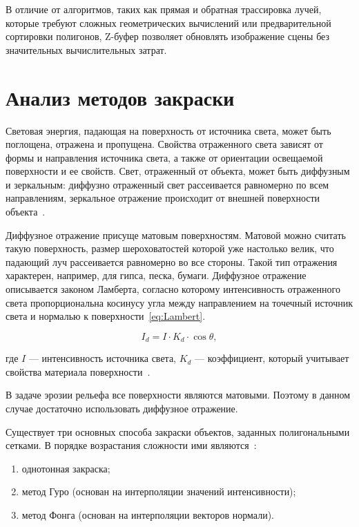 В отличие от алгоритмов, таких как прямая и обратная трассировка лучей,
которые требуют сложных геометрических вычислений или предварительной сортировки полигонов,
Z-буфер позволяет обновлять изображение сцены без значительных вычислительных затрат.

\clearpage

\section{Анализ методов закраски}

Световая энергия, падающая на поверхность от источника света, может быть поглощена,
отражена и пропущена.
Свойства отраженного света зависят от формы и направления источника света, а также от
ориентации освещаемой поверхности и ее свойств.
Свет, отраженный от объекта, может быть
диффузным и зеркальным: диффузно отраженный свет рассеивается равномерно по всем
направлениям, зеркальное отражение происходит от внешней поверхности объекта~\cite{cg_shik}.

Диффузное отражение присуще матовым поверхностям. Матовой можно считать такую поверхность,
размер шероховатостей которой уже настолько велик, что
падающий луч рассеивается равномерно во все стороны. Такой тип отражения характерен, например, для гипса, песка, бумаги.
Диффузное отражение описывается законом Ламберта, согласно которому интенсивность отраженного света
пропорциональна косинусу угла между направлением на точечный источник света и нормалью к поверхности~\ref{eq:Lambert}.

\begin{equation}
    \label{eq:Lambert}
    I_{d} = I \cdot K_{d} \cdot \cos{\theta},
\end{equation}

где $I$ — интенсивность источника света, $K_{d}$ — коэффициент, который учитывает свойства материала поверхности~\cite{perm_cg}.

В задаче эрозии рельефа все поверхности являются матовыми.
Поэтому в данном случае достаточно использовать диффузное отражение.

Существует три основных способа закраски объектов, заданных
полигональными сетками. В порядке возрастания сложности ими
являются~\cite{dem_cg}:

\begin{enumerate}
    \item однотонная закраска;
    \item метод Гуро (основан на интерполяции значений интенсивности);
    \item метод Фонга (основан на интерполяции векторов нормали).
\end{enumerate}

